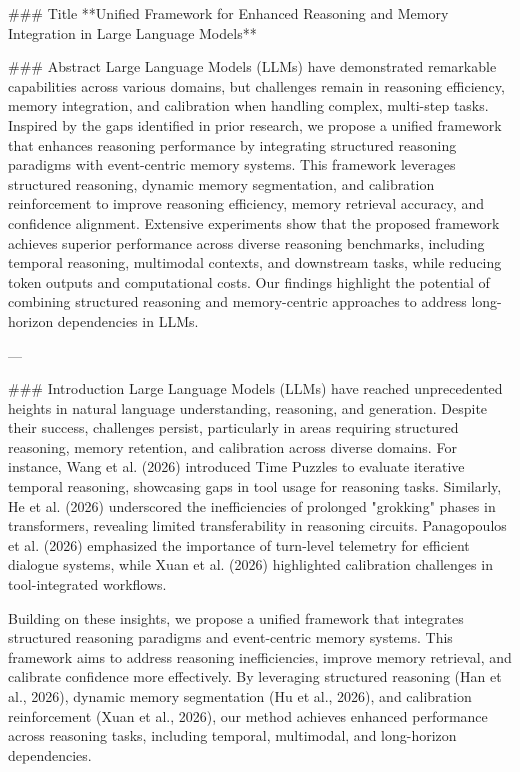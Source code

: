 ### Title  
**Unified Framework for Enhanced Reasoning and Memory Integration in Large Language Models**

### Abstract  
Large Language Models (LLMs) have demonstrated remarkable capabilities across various domains, but challenges remain in reasoning efficiency, memory integration, and calibration when handling complex, multi-step tasks. Inspired by the gaps identified in prior research, we propose a unified framework that enhances reasoning performance by integrating structured reasoning paradigms with event-centric memory systems. This framework leverages structured reasoning, dynamic memory segmentation, and calibration reinforcement to improve reasoning efficiency, memory retrieval accuracy, and confidence alignment. Extensive experiments show that the proposed framework achieves superior performance across diverse reasoning benchmarks, including temporal reasoning, multimodal contexts, and downstream tasks, while reducing token outputs and computational costs. Our findings highlight the potential of combining structured reasoning and memory-centric approaches to address long-horizon dependencies in LLMs.

---

### Introduction  
Large Language Models (LLMs) have reached unprecedented heights in natural language understanding, reasoning, and generation. Despite their success, challenges persist, particularly in areas requiring structured reasoning, memory retention, and calibration across diverse domains. For instance, Wang et al. (2026) introduced Time Puzzles to evaluate iterative temporal reasoning, showcasing gaps in tool usage for reasoning tasks. Similarly, He et al. (2026) underscored the inefficiencies of prolonged "grokking" phases in transformers, revealing limited transferability in reasoning circuits. Panagopoulos et al. (2026) emphasized the importance of turn-level telemetry for efficient dialogue systems, while Xuan et al. (2026) highlighted calibration challenges in tool-integrated workflows.

Building on these insights, we propose a unified framework that integrates structured reasoning paradigms and event-centric memory systems. This framework aims to address reasoning inefficiencies, improve memory retrieval, and calibrate confidence more effectively. By leveraging structured reasoning (Han et al., 2026), dynamic memory segmentation (Hu et al., 2026), and calibration reinforcement (Xuan et al., 2026), our method achieves enhanced performance across reasoning tasks, including temporal, multimodal, and long-horizon dependencies.

